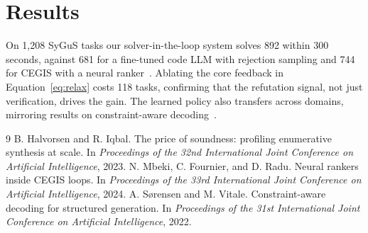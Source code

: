 \documentclass[10pt,twocolumn]{article}
\begin{document}
\section{Results}
On 1{,}208 SyGuS tasks our solver-in-the-loop system solves 892 within 300
seconds, against 681 for a fine-tuned code LLM with rejection sampling and
744 for CEGIS with a neural ranker~\cite{mbeki2024cegis}. Ablating the core
feedback in Equation~\eqref{eq:relax} costs 118 tasks, confirming that the
refutation signal, not just verification, drives the gain. The learned
policy also transfers across domains, mirroring results on constraint-aware
decoding~\cite{sorensen2022decode}.

\begin{thebibliography}{9}
 B. Halvorsen and R. Iqbal.
The price of soundness: profiling enumerative synthesis at scale.
In \textit{Proceedings of the 32nd International Joint Conference on Artificial Intelligence}, 2023.
 N. Mbeki, C. Fournier, and D. Radu.
Neural rankers inside CEGIS loops.
In \textit{Proceedings of the 33rd International Joint Conference on Artificial Intelligence}, 2024.
 A. S\o rensen and M. Vitale.
Constraint-aware decoding for structured generation.
In \textit{Proceedings of the 31st International Joint Conference on Artificial Intelligence}, 2022.
\end{thebibliography}
\end{document}
